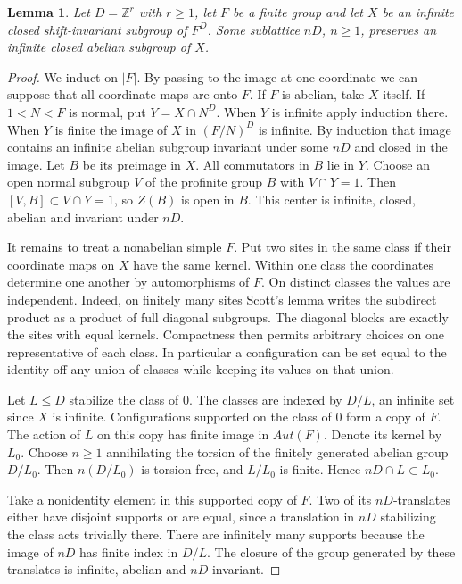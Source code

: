 \documentclass[11pt,a4paper]{article}
\newtheorem{lem}[thm]{Lemma}
\theoremstyle{remark}
\begin{document}
\begin{lem}\label{abelianshift}
Let $D=\mathbb Z^r$ with $r\ge1$, let $F$ be a finite group and let $X$
be an infinite closed shift-invariant subgroup of $F^D$. Some sublattice
$nD$, $n\ge1$, preserves an infinite closed abelian subgroup of $X$.
\end{lem}
\begin{proof}
We induct on $|F|$. By passing to the image at one coordinate we can
suppose that all coordinate maps are onto $F$. If $F$ is abelian, take
$X$ itself. If $1<N<F$ is normal, put $Y=X\cap N^D$. When $Y$ is
infinite apply induction there. When $Y$ is finite the image of $X$ in
$(F/N)^D$ is infinite. By induction that image contains an infinite
abelian subgroup invariant under some $nD$ and closed in the image.
Let $B$ be its preimage in $X$. All commutators in $B$ lie in $Y$.
Choose an open normal subgroup $V$ of the profinite group $B$ with
$V\cap Y=1$. Then $[V,B]\subset V\cap Y=1$, so $Z(B)$ is open in $B$.
This center is infinite, closed, abelian and invariant under $nD$.

It remains to treat a nonabelian simple $F$. Put two sites in the same
class if their coordinate maps on $X$ have the same kernel. Within one
class the coordinates determine one another by automorphisms of $F$.
On distinct classes the values are independent. Indeed, on finitely many
sites Scott's lemma \cite[p.~328]{scott} writes the subdirect product as a
product of full diagonal subgroups. The diagonal blocks are exactly the
sites with equal kernels. Compactness then permits arbitrary choices on
one representative of each class. In particular a configuration can be set
equal to the identity off any union of classes while keeping its values
on that union.

Let $L\le D$ stabilize the class of $0$. The classes are indexed by
$D/L$, an infinite set since $X$ is infinite. Configurations supported
on the class of $0$ form a copy of $F$. The action of $L$ on this copy
has finite image in $Aut(F)$. Denote its kernel by $L_0$. Choose $n\ge1$ annihilating the torsion of the finitely
generated abelian group $D/L_0$. Then $n(D/L_0)$ is torsion-free,
and $L/L_0$ is finite. Hence $nD\cap L\subset L_0$.

Take a nonidentity element in this supported copy of $F$. Two of its
$nD$-translates either have disjoint supports or are equal, since a
translation in $nD$ stabilizing the class acts trivially there. There
are infinitely many supports because the image of $nD$ has finite
index in $D/L$. The closure of the group generated by these translates
is infinite, abelian and $nD$-invariant.
\end{proof}
\end{document}
